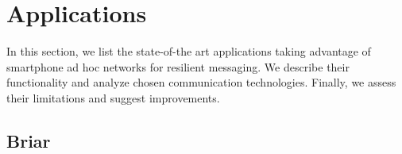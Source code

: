 \documentclass[conference,compsoc]{IEEEtran}
\begin{document}





\section{Applications} \label{applications}

In this section, we list the state-of-the art applications taking advantage of smartphone ad hoc networks for resilient messaging. We describe their functionality and analyze chosen communication technologies. Finally, we assess their limitations and suggest improvements.

\subsection{Briar}
\end{document}
